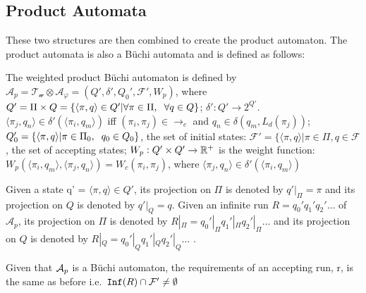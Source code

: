 \subsection{Product Automata}
These two structures are then combined to create the product automaton. The product automata is also a B\"{u}chi automata and is defined as follows:
\begin{definition}
The weighted product B\"{u}chi automaton is defined by $\mathcal{A}_p = \mathcal{T_w} \otimes \mathcal{A}_\varphi = (Q', \delta', Q_0', \mathcal{F}', W_p)$, where $Q' = \Pi \times Q = \{ \langle \pi, q \rangle \in Q' | \forall \pi \in \Pi, \hspace{0.2cm} \forall q \in Q \}$; $\delta': Q' \rightarrow 2^{Q'}$. $\langle \pi_j, q_n \rangle \in \delta' (\langle \pi_i, q_m \rangle )$ iff $(\pi_i , \pi_j ) \in \rightarrow_c$ and $q_n \in \delta (q_m, L_d(\pi_j))$; $Q_0' = \{ \langle \pi , q \rangle | \pi \in \Pi_0, \hspace{0.2cm} q_0 \in Q_0\}$, the set of initial states: $\mathcal{F}' = \{ \langle \pi, q \rangle | \pi \in \Pi, q \in \mathcal{F}$, the set of accepting states; $W_p: Q' \times Q' \rightarrow \mathbb{R}^+$ is the weight function: $W_p(\langle \pi_i, q_m \rangle , \langle \pi_j, q_n \rangle ) = W_c (\pi_i, \pi_j)$, where $\langle \pi_j, q_n \rangle \in \delta' ( \langle \pi_i, q_m \rangle )$
\end{definition} 

Given a state q' = $\langle \pi, q \rangle \in Q'$, its projection on $\Pi$ is denoted by $q'|_\Pi = \pi$ and its projection on $Q$ is denoted by $q'|_Q = q$. Given an infinite run $R = q_0' q_1' q_2' \dots$ of $\mathcal{A}_p$, its projection on $\Pi$ is denoted by $R|_\Pi = q_0'|_\Pi q_1'|_\Pi q_2'|_\Pi \dots$ and its projection on $Q$ is denoted by $R|_Q  = q_0'|_Q q_1'|_Q q_2'|_Q \dots$ \cite{guo15}. 

Given that $\mathcal{A}_p$ is a B\"{u}chi automaton, the requirements of an accepting run, r, is the same as before i.e.\ $\texttt{Inf}(R) \cap \mathcal{F}' \neq \emptyset$

%
%


